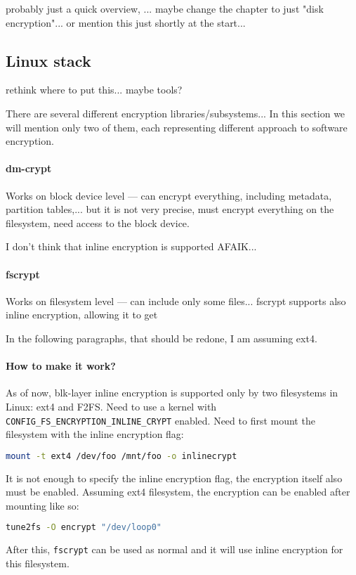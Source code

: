 probably just a quick overview, ... maybe change the chapter to just "disk encryption"... or mention this just shortly at the start...

\subsection{Linux stack}

rethink where to put this... maybe tools?

There are several different encryption libraries/subsystems... In this section we will mention only two of them, each representing different approach to software encryption.

\paragraph{dm-crypt}

Works on block device level --- can encrypt everything, including metadata, partition tables,...
but it is not very precise, must encrypt everything on the filesystem, need access to the block device.

I don't think that inline encryption is supported AFAIK...

\paragraph{fscrypt}

Works on filesystem level --- can include only some files...
fscrypt supports also inline encryption, allowing it to get

In the following paragraphs, that should be redone, I am assuming ext4.

\paragraph{How to make it work?}

As of now, blk-layer inline encryption is supported only by two filesystems in Linux: ext4 and F2FS.
Need to use a kernel with \verb|CONFIG_FS_ENCRYPTION_INLINE_CRYPT| enabled.
Need to first mount the filesystem with the inline encryption flag:
\begin{lstlisting}[language=bash]
mount -t ext4 /dev/foo /mnt/foo -o inlinecrypt
\end{lstlisting}
It is not enough to specify the inline encryption flag, the encryption itself also must be enabled. Assuming ext4 filesystem, the encryption can be enabled after mounting like so:
\begin{lstlisting}[language=bash]
tune2fs -O encrypt "/dev/loop0"
\end{lstlisting}
After this, \verb|fscrypt| can be used as normal and it will use inline encryption for this filesystem. 

